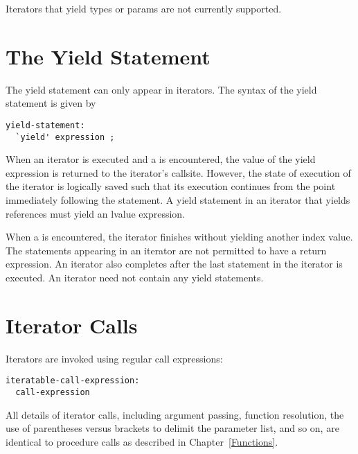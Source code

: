 \begin{openissue}
Iterators that yield types or params are not currently supported.
\end{openissue}

\section{The Yield Statement}
\label{The_Yield_Statement}

The yield statement can only appear in iterators.  The syntax of the
yield statement is given by
\begin{syntax}
\begin{verbatim}
yield-statement:
  `yield' expression ;
\end{verbatim}
\end{syntax}

When an iterator is executed and a  is encountered, the
value of the yield expression is returned to the iterator's callsite.
However, the state of execution of the iterator is logically saved
such that its execution continues from the point immediately following
the  statement.  A yield statement in an iterator that
yields references must yield an lvalue expression.

When a  is encountered, the iterator finishes without yielding another
index value.  The  statements appearing in an iterator are not
permitted to have a return expression.
An iterator also completes after the last
statement in the iterator is executed.
An iterator need not contain any yield statements.


\section{Iterator Calls}
\label{Iterator_Calls}

Iterators are invoked using regular call expressions:
\begin{syntax}
\begin{verbatim}
iteratable-call-expression:
  call-expression
\end{verbatim}
\end{syntax}

All details of iterator calls, including argument passing, function
resolution, the use of parentheses versus brackets to delimit the parameter
list, and so on,
are identical to procedure calls as described in Chapter~\ref{Functions}.

